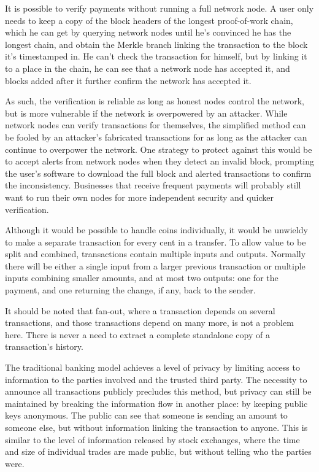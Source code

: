 \documentclass{article}
\begin{document}
It is possible to verify payments without running a full network node. A user only needs to keep a copy of the block headers of the longest proof-of-work chain, which he can get by querying network nodes until he's convinced he has the longest chain, and obtain the Merkle branch linking the transaction to the block it's timestamped in. He can't check the transaction for himself, but by linking it to a place in the chain, he can see that a network node has accepted it, and blocks added after it further confirm the network has accepted it.

As such, the verification is reliable as long as honest nodes control the network, but is more vulnerable if the network is overpowered by an attacker. While network nodes can verify transactions for themselves, the simplified method can be fooled by an attacker's fabricated transactions for as long as the attacker can continue to overpower the network. One strategy to protect against this would be to accept alerts from network nodes when they detect an invalid block, prompting the user's software to download the full block and alerted transactions to confirm the inconsistency. Businesses that receive frequent payments will probably still want to run their own nodes for more independent security and quicker verification.

Although it would be possible to handle coins individually, it would be unwieldy to make a separate transaction for every cent in a transfer. To allow value to be split and combined, transactions contain multiple inputs and outputs. Normally there will be either a single input from a larger previous transaction or multiple inputs combining smaller amounts, and at most two outputs: one for the payment, and one returning the change, if any, back to the sender.

It should be noted that fan-out, where a transaction depends on several transactions, and those transactions depend on many more, is not a problem here. There is never a need to extract a complete standalone copy of a transaction's history.

The traditional banking model achieves a level of privacy by limiting access to information to the parties involved and the trusted third party. The necessity to announce all transactions publicly precludes this method, but privacy can still be maintained by breaking the information flow in another place: by keeping public keys anonymous. The public can see that someone is sending an amount to someone else, but without information linking the transaction to anyone. This is similar to the level of information released by stock exchanges, where the time and size of individual trades are made public, but without telling who the parties were.
\end{document}

